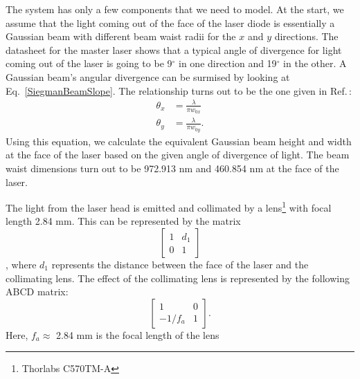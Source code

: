 The system has only a few components that we need to model. At the start, we assume that the light coming out of the face of the laser diode is essentially a Gaussian beam with different beam waist radii for the $x$ and $y$ directions. The datasheet for the master laser shows that a typical angle of divergence for light coming out of the laser is going to be 9$^\circ$ in one direction and 19$^\circ$ in the other. A Gaussian beam's angular divergence can be surmised by looking at Eq.\ \ref{SiegmanBeamSlope}. The relationship turns out to be the one given in Ref.\,\cite{MellesGriotGaussian}:
\begin{align}
\theta_{x} &= \frac{\lambda}{\pi w_{0x}}\\
\theta_{y} &= \frac{\lambda}{\pi w_{0y}}.
\end{align}  
Using this equation, we calculate the equivalent Gaussian beam height and width at the face of the laser based on the given angle of divergence of light. The beam waist dimensions turn out to be 972.913 nm and 460.854 nm at the face of the laser.

The light from the laser head is emitted and collimated by a lens\footnote{Thorlabs C570TM-A} with focal length 2.84 mm.%
This can be represented by the matrix 
\begin{equation}
\begin{bmatrix}\label{ABCD1}
1 & d_1 \\ 0 & 1
\end{bmatrix}
\end{equation},
where $d_1$ represents the distance between the face of the laser and the collimating lens. The effect of the collimating lens is represented by the following ABCD matrix:
\begin{equation}
\begin{bmatrix}\label{ABCD2}
1 & 0 \\ -1/f_{a} & 1
\end{bmatrix}.
\end{equation}
Here, $f_a\approx$ 2.84 mm is the focal length of the lens

